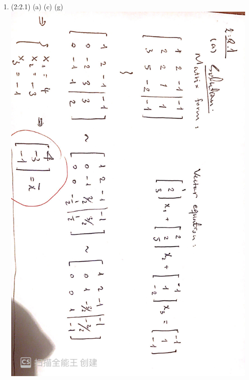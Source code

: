\documentclass[]{book}
\theoremstyle{definition}
\newcommand{\0}{\mathbf{0}}
\begin{document}
\begin{enumerate}[label=\arabic*\degree]
\item (2:2.1) (a) (c) (g) \newline
\includegraphics[scale=0.15, angle=90]{images/1a.jpg}\bigbreak

\end{enumerate}
\end{document}
